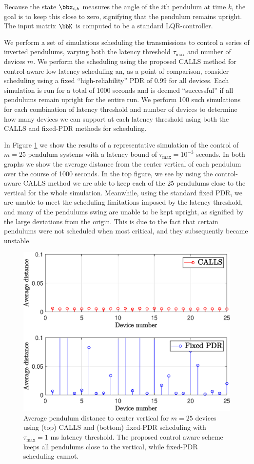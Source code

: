 Because the state $\bbx_{i,k}$ measures the angle of the $i$th pendulum at time $k$, the goal is to keep this close to zero, signifying that the pendulum remains upright. The input matrix $\bbK$ is computed to be a standard LQR-controller.

We perform a set of simulations scheduling the transmissions to control a series of inverted pendulums, varying both the latency threshold $\tau_{\max}$ and number of devices $m$. We perform the scheduling using the proposed CALLS method for control-aware low latency scheduling an, as a point of comparison, consider scheduling using a fixed ``high-reliability'' PDR of $0.99$ for all devices. Each simulation is run for a total of $1000$ seconds and is deemed ``successful'' if all pendulums remain upright for the entire run. We perform 100 such simulations for each combination of latency threshold and number of devices to determine how many devices we can support at each latency threshold using both the CALLS and fixed-PDR methods for scheduling.

In Figure \ref{fig_ip_dist} we show the results of a representative simulation of the control of $m=25$ pendulum systems with a latency bound of $\tau_{\max} = 10^{-3}$ seconds. In both graphs we show the average distance from the center vertical of each pendulum over the course of 1000 seconds. In the top figure, we see by using the control-aware CALLS method we are able to keep each of the 25 pendulums close to the vertical for the whole simulation. Meanwhile, using the standard fixed PDR, we are unable to meet the scheduling limitations imposed by the latency threshold, and many of the pendulums swing are unable to be kept upright, as signified by the large deviations from the origin. This is due to the fact that certain pendulums were not scheduled when most critical, and they subsequently became unstable.

\begin{figure}
\centering
\includegraphics[width=.45\textwidth]{images/ip_dist.eps}
\caption{Average pendulum distance to center vertical for $m=25$ devices using (top) CALLS and (bottom) fixed-PDR scheduling with $\tau_{\max}= 1$ ms latency threshold. The proposed control aware scheme keeps all pendulums close to the vertical, while fixed-PDR scheduling cannot.}
\label{fig_ip_dist}
\end{figure}

